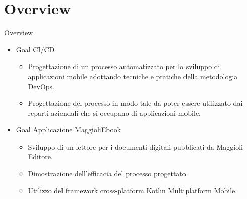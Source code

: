 
\section{Overview}
    \begin{frame}{Overview}
        \begin{itemize}
            \item Goal CI/CD
                \begin{itemize}
                    \item Progettazione di un processo automatizzato per lo sviluppo di applicazioni mobile adottando tecniche e pratiche della metodologia DevOps.
                    \item Progettazione del processo in modo tale da poter essere utilizzato dai reparti aziendali che si occupano di applicazioni mobile.
                \end{itemize}
            \item Goal Applicazione MaggioliEbook
                \begin{itemize}
                    \item Sviluppo di un lettore per i documenti digitali pubblicati da Maggioli Editore.
                    \item Dimostrazione dell'efficacia del processo progettato.
                    \item Utilizzo del framework cross-platform Kotlin Multiplatform Mobile.
                \end{itemize}
        \end{itemize}
    \end{frame}